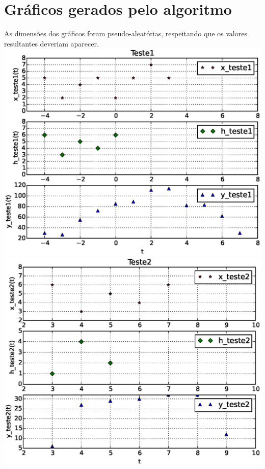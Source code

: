 \documentclass[dvipdfm, a4paper, 11pt]{report}
\begin{document}
{\section{Gráficos gerados pelo algoritmo}
As dimensões dos gráficos foram pseudo-aleatórias, respeitando que os valores resultantes deveriam aparecer.\\
\includegraphics[scale = 0.5]{Teste1.eps}\\
\includegraphics[scale = 0.5]{Teste2.eps}\\
}
\end{document}
